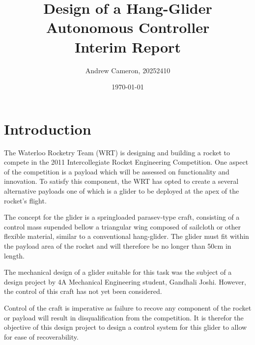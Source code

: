 \documentclass{sydeStyle}
\title{
Design of a Hang-Glider Autonomous Controller\\
Interim Report
}
\date{\today}
\author{Andrew Cameron, 20252410}
\begin{document}
\maketitle

\chapter{Introduction}

The Waterloo Rocketry Team (WRT) is designing and building a rocket to compete
in the 2011 Intercollegiate Rocket Engineering Competition. One aspect of the
competition is a payload which will be assessed on functionality and
innovation.\cite{IREC} To satisfy this component, the WRT has opted to create a
several alternative payloads one of which is a glider to be deployed at the apex
of the rocket's flight.

The concept for the glider is a springloaded parasev-type craft, 
consisting of a control mass supended bellow a triangular wing composed of
sailcloth or other flexible material, similar to a conventional
hang-glider.\cite{wiki:parasev} The glider must fit within the payload area of
the rocket and will therefore be no longer than 50cm in length.

The mechanical design of a glider suitable for this task was the subject of a
design project by 4A Mechanical Engineering student, Gandhali Joshi. However,
the control of this craft has not yet been considered.

Control of the craft is imperative as failure to recove any component of
the rocket or payload will result in disqualification from the
competition.\cite{IREC} It is therefor the objective of this design project to
design a control system for this glider to allow for ease of recoverability.
\end{document}
